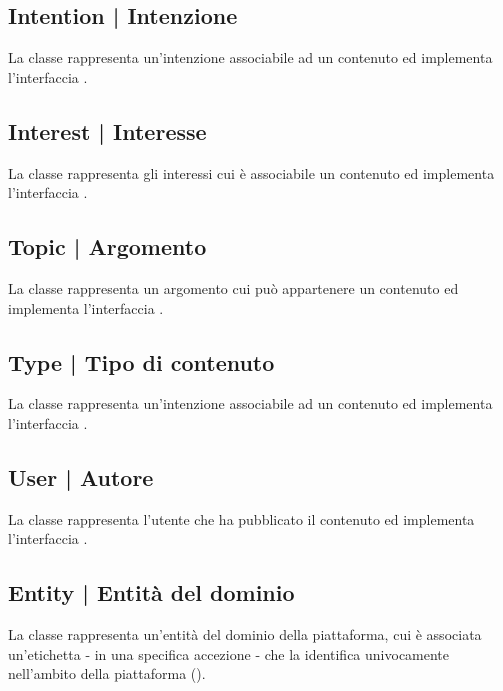 \documentclass[10pt,a4paper,headinclude,footinclude,hidelinks]{scrreprt} %
\begin{document}
	\subsection[Intention]{Intention | Intenzione}
	\label{sec:stage:design:model:metadata-intention}
	La classe \textit{} rappresenta un'intenzione associabile ad un contenuto ed implementa l'interfaccia \textit{}.

	\subsection[Interest]{Interest | Interesse}
	\label{sec:stage:design:model:metadata-interest}
	La classe \textit{} rappresenta gli interessi cui è associabile un contenuto ed implementa l'interfaccia \textit{}.

	\subsection[Topic]{Topic | Argomento}
	\label{sec:stage:design:model:metadata-topic}
	La classe \textit{} rappresenta un argomento cui può appartenere un contenuto ed implementa l'interfaccia \textit{}.

	\subsection[Type]{Type | Tipo di contenuto}
	\label{sec:stage:design:model:metadata-type}
	La classe \textit{} rappresenta un'intenzione associabile ad un contenuto ed implementa l'interfaccia \textit{}.

	\subsection[User]{User | Autore}
	\label{sec:stage:design:model:metadata-user}
	La classe \textit{} rappresenta l'utente che ha pubblicato il contenuto ed implementa l'interfaccia \textit{}.

	\subsection[Entity]{Entity | Entità del dominio}
	\label{sec:stage:design:model:entity}
	La classe \textit{} rappresenta un'entità del dominio della piattaforma, cui è associata un'etichetta - in una specifica accezione - che la identifica univocamente nell'ambito della piattaforma (\textit{}).
\end{document}
